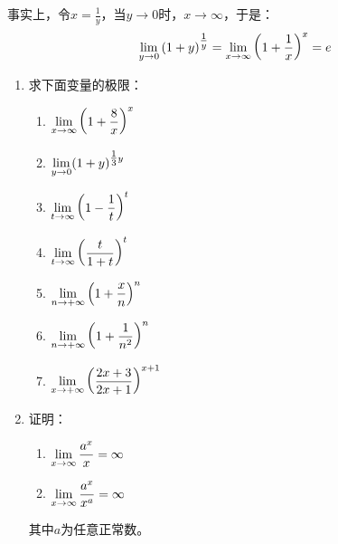 事实上，令$x=\frac{1}{y}$，当$y\to 0$时，$x\to\infty$，于是：
\[\displaystyle\lim_{y\to 0}\left(1+y\right)^{\tfrac{1}{y}}=\displaystyle\lim_{x\to \infty}\left(1+\dfrac{1}{x}\right)^{x}=e\]

\begin{ex}
\begin{enumerate}
    \item 求下面变量的极限：
\begin{multicols}{2}
\begin{enumerate}
    \item $\displaystyle\lim_{x\to\infty}\left(1+\dfrac{8}{x}\right)^x$
    \item $\displaystyle\lim_{y\to 0}(1+y)^{\tfrac{1}{3}y}$
    \item $\displaystyle\lim_{t\to\infty}\left(1-\dfrac{1}{t}\right)^t$
    \item $\displaystyle\lim_{t\to\infty}\left(\dfrac{t}{1+t}\right)^t$
    \item $\displaystyle\lim_{n\to+\infty}\left(1+\dfrac{x}{n}\right)^n$
    \item $\displaystyle\lim_{n\to +\infty}\left(1+\dfrac{1}{n^2}\right)^n$
    \item $\displaystyle\lim_{x\to+\infty}\left(\dfrac{2x+3}{2x+1}\right)^{x+1}$
\end{enumerate}
\end{multicols}

\item 证明：
\begin{multicols}{2}
\begin{enumerate}
    \item $\displaystyle\lim_{x\to\infty}\dfrac{a^x}{x}=\infty$
    \item $\displaystyle\lim_{x\to\infty}\dfrac{a^x}{x^a}=\infty$
\end{enumerate}
\end{multicols}
其中$a$为任意正常数。
\end{enumerate}
\end{ex}


\begin{example}
    
\end{example}


\begin{solution}
    
\end{solution}


\begin{example}
    
\end{example}

\begin{solution}
    
\end{solution}

